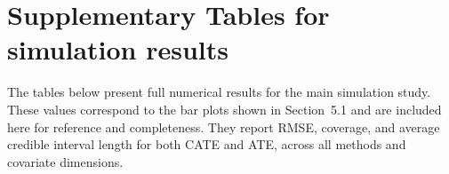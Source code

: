 \newpage
\section{Supplementary Tables for simulation results}\label{appendix:main_sim}

The tables below present full numerical results for the main simulation study.
These values correspond to the bar plots shown in Section~5.1 \citep{main_article} and are included here for reference and completeness.
They report RMSE, coverage, and average credible interval length for both CATE and ATE, across all methods and covariate dimensions.


